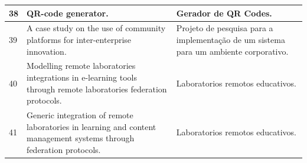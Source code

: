 \begin{apendicesenv}
\begin{landscape}
\begin{longtable}{|p{10pt}|p{320pt}|p{315pt}|}
 	 	    	 	
 	 	  {\raggedright 38}
 	 	   	 	 & {\raggedright{QR}-code generator.}
 	 	   	 	 & {\raggedright Gerador de QR Codes.\cite{Sutheebanjard2010}} \\
 	 	   	 	\hline
	{\raggedright 39}
 	 	  	 & {\raggedright A case study on the use of community platforms for inter-enterprise innovation.}
 	 	  	 	 	 	 	 	 & {Projeto de pesquisa para a implementação de um sistema para um ambiente corporativo.\cite{Larrinaga2011}} \\
 	 	  	 	 	 	 	 	\hline
 	 	  	 	
 	 	  	 {\raggedright 40}
 	 	  	  	 	   	 	 & {\raggedright Modelling remote laboratories integrations in e-learning tools through remote laboratories federation protocols.}
 	 	  	  	 	   	 	 & {\raggedright Laboratorios remotos educativos.\cite{Orduna2012}} \\
 	 	  	  	 	   	 	\hline	
 	 	  	 	
 	 	  	 	
 	 	  	 	{\raggedright 41}
 	 	  	 	 	 	 & {\raggedright Generic integration of remote laboratories in learning and content management systems through federation protocols. }
 	 	  	 	 	 	 & {\raggedright Laboratorios remotos educativos.\cite{Orduna2013}} \\
 	 	  	 	 	 	\hline
 	 	  	 	 	 	
 	 	   	 	 	 	   	 		 	  	 	
 	\end{longtable}
 	

\end{landscape}
\end{apendicesenv}
